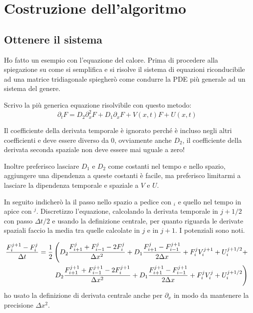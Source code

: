 \section{Costruzione dell'algoritmo}
\subsection{Ottenere il sistema}
Ho fatto un esempio con l'equazione del calore. Prima di procedere alla spiegazione su come si semplifica e si risolve il sistema di equazioni riconducibile ad una matrice tridiagonale spiegher\`o come condurre la PDE pi\`u generale ad un sistema del genere.

Scrivo la pi\`u generica equazione risolvibile con questo metodo:
\begin{equation}\label{eq:generica}
  \partial_t F = D_2 \partial^2_x F + D_1 \partial_x F + V(x,t) F + U(x,t)
\end{equation}

Il coefficiente della derivata temporale \`e ignorato perch\'e \`e incluso negli altri coefficienti e deve essere diverso da 0, ovviamente anche $D_2$, il coefficiente della derivata seconda spaziale non deve essere mai uguale a zero!

Inoltre preferisco lasciare $D_1$ e $D_2$ come costanti nel tempo e nello spazio, aggiungere una dipendenza a queste costanti \`e facile, ma preferisco limitarmi a lasciare la dipendenza temporale e spaziale a $V$ e $U$.

In seguito indicher\`o la il passo nello spazio a pedice con $_i$ e quello nel tempo in apice con $^j$.
Discretizzo l'equazione, calcolando la derivata temporale in $j+1/2$ con passo $\Delta t/2$ e usando la definizione centrale, per quanto riguarda le derivate spaziali faccio la media tra quelle calcolate in $j$ e in $j+1$. I potenziali sono noti.

\begin{equation}
  \begin{aligned}
    \frac{F_i^{j+1} - F_i^j}{\Delta t} = \frac 12&\lr(.{D_2\frac{F^j_{i+1}+F^{j}_{i-1}-2F_i^{j}}{\Delta x^2} + D_1\frac{F^j_{i+1}-F^{j+1}_{i-1}}{2\Delta x} + F_i^j V_i^{j+1} + U_i^{j+1/2}+}\\
    &\lr.){D_2\frac{F^{j+1}_{i+1}+F^{j+1}_{i-1}-2F_i^{j+1}}{\Delta x^2} + D_1\frac{F^{j+1}_{i+1}-F^{j+1}_{i-1}}{2\Delta x} + F_i^{j} V_i^{j} + U_i^{j+1/2}}
  \end{aligned}
\end{equation}
ho usato la definizione di derivata centrale anche per $\partial_x$ in modo da mantenere la precisione $\Delta x^2$.

